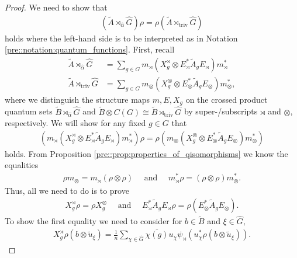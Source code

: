 \documentclass{amsart}
\theoremstyle{definition}
\theoremstyle{definition}
\begin{document}
\begin{proof}
    We need to show that
    \begin{align*}
        (\tilde{A} \rtimes_{\hat{\alpha}} \hat{G}) \rho
            = \rho (\tilde{A} \rtimes_{\mathrm{triv}} \hat{G})
    \end{align*}
    holds where the left-hand side is to be interpreted as in Notation \ref{pre::notation:quantum_functions}. First, recall
    \begin{align*}
        \tilde{A} \rtimes_{\hat{\alpha}} \hat{G}
            &= \sum_{g \in G} m_\rtimes(X_g^\rtimes \otimes E_\rtimes^\ast \tilde{A}_g E_\rtimes) m_\rtimes^\ast \\
        \tilde{A} \rtimes_{\mathrm{triv}} \hat{G}
            &= \sum_{g \in G} m_\otimes(X_g^\otimes \otimes E_\otimes^\ast \tilde{A}_g E_\otimes) m_\otimes^\ast,
    \end{align*}
    where we distinguish the structure maps $m, E, X_g$ on the crossed product quantum sets $\tilde{B} \rtimes_{\hat{\alpha}} \hat{G}$ and $\tilde{B} \otimes C(G) \cong \tilde{B} \rtimes_{\mathrm{triv}} \hat{G}$ by super-/subscripts $\rtimes$ and $\otimes$, respectively. 
    We will show for any fixed $g \in G$ that
    \begin{align*}
        (m_\rtimes(X_g^\rtimes \otimes E_\rtimes^\ast \tilde{A}_g E_\rtimes) m_\rtimes^\ast) \rho
        = \rho (m_\otimes(X_g^\otimes \otimes E_\otimes^\ast \tilde{A}_g E_\otimes) m_\otimes^\ast)
    \end{align*}
    holds. From Proposition \ref{pre::prop:properties_of_qisomorphisms} we know the equalities
    \begin{align*}
        \rho m_\otimes = m_\rtimes (\rho \otimes \rho)
        \quad \text{ and } \quad
        m_\rtimes^\ast \rho = (\rho \otimes \rho) m_\otimes^\ast.
    \end{align*}
    Thus, all we need to do is to prove
    \begin{align*}
        X_g^\rtimes \rho = \rho X_g^\otimes
        \quad \text{ and } \quad
        E_\rtimes^\ast \tilde{A}_g E_\rtimes \rho = \rho (E_\otimes^\ast \tilde{A}_g E_\otimes).
    \end{align*}
    To show the first equality we need to consider for $b \in \tilde{B}$ and $\xi \in \hat{G}$,
    \begin{align*}
        X_g^\rtimes \rho(b \otimes \tilde{u}_\xi)
            = \frac{1}{n} \sum_{\chi \in \hat{G}} \overline{\chi(g)} u_\chi \psi_\rtimes(u_\chi^\ast \rho(b \otimes \tilde{u}_\xi)).
    \end{align*}

\end{proof}
\end{document}
